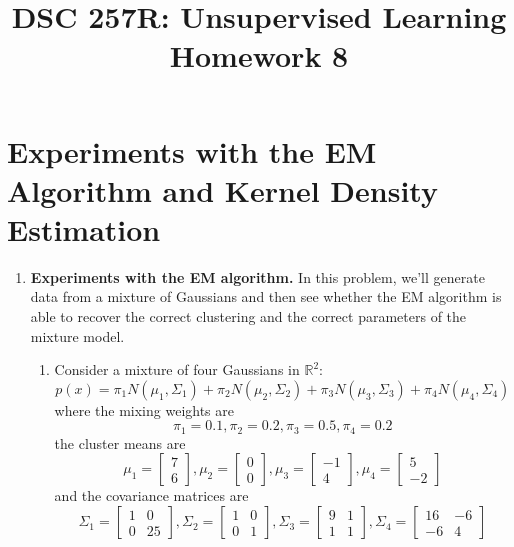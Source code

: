 \documentclass{article}
\title{DSC 257R: Unsupervised Learning \\ Homework 8}
\author{}
\date{}
\begin{document}
\maketitle

\section*{Experiments with the EM Algorithm and Kernel Density Estimation}

\begin{enumerate}
\item \textbf{Experiments with the EM algorithm.} In this problem, we'll generate data from a mixture of Gaussians and then see whether the EM algorithm is able to recover the correct clustering and the correct parameters of the mixture model.

\begin{enumerate}
\item Consider a mixture of four Gaussians in $\mathbb{R}^2$:
\[
p(x) = \pi_1 N(\mu_1, \Sigma_1) + \pi_2 N(\mu_2, \Sigma_2) + \pi_3 N(\mu_3, \Sigma_3) + \pi_4 N(\mu_4, \Sigma_4)
\]
where the mixing weights are
\[
\pi_1 = 0.1, \pi_2 = 0.2, \pi_3 = 0.5, \pi_4 = 0.2
\]
the cluster means are
\[
\mu_1 = \begin{bmatrix}7 \\ 6\end{bmatrix}, \mu_2 = \begin{bmatrix}0 \\ 0\end{bmatrix}, \mu_3 = \begin{bmatrix}-1 \\ 4\end{bmatrix}, \mu_4 = \begin{bmatrix}5 \\ -2\end{bmatrix}
\]
and the covariance matrices are
\[
\Sigma_1 = \begin{bmatrix}1 & 0 \\ 0 & 25\end{bmatrix}, \Sigma_2 = \begin{bmatrix}1 & 0 \\ 0 & 1\end{bmatrix}, \Sigma_3 = \begin{bmatrix}9 & 1 \\ 1 & 1\end{bmatrix}, \Sigma_4 = \begin{bmatrix}16 & -6 \\ -6 & 4\end{bmatrix}
\]


\end{enumerate}
\end{enumerate}
\end{document}
